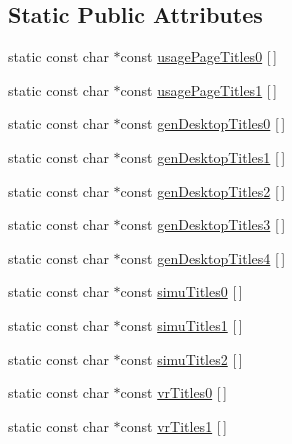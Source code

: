 \subsection*{\-Static \-Public \-Attributes}
\begin{DoxyCompactItemize}
\item 
static const char $\ast$const \hyperlink{class_report_desc_parser_base_a9e912750d3675352614ee0b1bf73fa82}{usage\-Page\-Titles0} \mbox{[}$\,$\mbox{]}
\item 
static const char $\ast$const \hyperlink{class_report_desc_parser_base_ae6dadd42986663f261aac948d24911a6}{usage\-Page\-Titles1} \mbox{[}$\,$\mbox{]}
\item 
static const char $\ast$const \hyperlink{class_report_desc_parser_base_a3021443d9320135788844c166240149f}{gen\-Desktop\-Titles0} \mbox{[}$\,$\mbox{]}
\item 
static const char $\ast$const \hyperlink{class_report_desc_parser_base_a0cca04764c613389545ab02cce068367}{gen\-Desktop\-Titles1} \mbox{[}$\,$\mbox{]}
\item 
static const char $\ast$const \hyperlink{class_report_desc_parser_base_a043e24aa742e9257202a2dc80725122c}{gen\-Desktop\-Titles2} \mbox{[}$\,$\mbox{]}
\item 
static const char $\ast$const \hyperlink{class_report_desc_parser_base_acef88e30e3582b47deecf615495a3e8d}{gen\-Desktop\-Titles3} \mbox{[}$\,$\mbox{]}
\item 
static const char $\ast$const \hyperlink{class_report_desc_parser_base_ae2b1ca00d24f5c3867c90ea49ffa6e0d}{gen\-Desktop\-Titles4} \mbox{[}$\,$\mbox{]}
\item 
static const char $\ast$const \hyperlink{class_report_desc_parser_base_a6995298d3333564e02e06bf94f0ca5ca}{simu\-Titles0} \mbox{[}$\,$\mbox{]}
\item 
static const char $\ast$const \hyperlink{class_report_desc_parser_base_a934e0398770633c85a9e9f8cfb319f0a}{simu\-Titles1} \mbox{[}$\,$\mbox{]}
\item 
static const char $\ast$const \hyperlink{class_report_desc_parser_base_a5d9d0f1b2820bbfdddf6d54e1d826c83}{simu\-Titles2} \mbox{[}$\,$\mbox{]}
\item 
static const char $\ast$const \hyperlink{class_report_desc_parser_base_a42d34a0a49f987c9dcfdd4fb8d42bf0d}{vr\-Titles0} \mbox{[}$\,$\mbox{]}
\item 
static const char $\ast$const \hyperlink{class_report_desc_parser_base_a41af57cb0fb0bbed7277bcd04a9e9fe9}{vr\-Titles1} \mbox{[}$\,$\mbox{]}
\item 

\end{DoxyCompactItemize}
